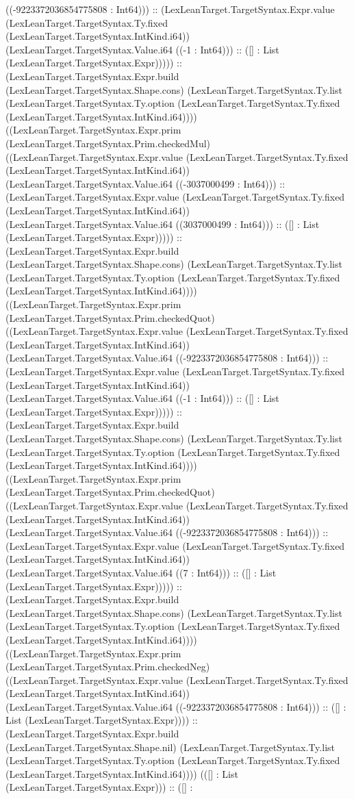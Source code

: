 \documentclass[11pt]{article}
\begin{document}
((-9223372036854775808 : Int64))) :: (LexLeanTarget.TargetSyntax.Expr.value (LexLeanTarget.TargetSyntax.Ty.fixed (LexLeanTarget.TargetSyntax.IntKind.i64)) (LexLeanTarget.TargetSyntax.Value.i64 ((-1 : Int64))) :: ([] : List (LexLeanTarget.TargetSyntax.Expr))))) :: (LexLeanTarget.TargetSyntax.Expr.build (LexLeanTarget.TargetSyntax.Shape.cons) (LexLeanTarget.TargetSyntax.Ty.list (LexLeanTarget.TargetSyntax.Ty.option (LexLeanTarget.TargetSyntax.Ty.fixed (LexLeanTarget.TargetSyntax.IntKind.i64)))) ((LexLeanTarget.TargetSyntax.Expr.prim (LexLeanTarget.TargetSyntax.Prim.checkedMul) ((LexLeanTarget.TargetSyntax.Expr.value (LexLeanTarget.TargetSyntax.Ty.fixed (LexLeanTarget.TargetSyntax.IntKind.i64)) (LexLeanTarget.TargetSyntax.Value.i64 ((-3037000499 : Int64))) :: (LexLeanTarget.TargetSyntax.Expr.value (LexLeanTarget.TargetSyntax.Ty.fixed (LexLeanTarget.TargetSyntax.IntKind.i64)) (LexLeanTarget.TargetSyntax.Value.i64 ((3037000499 : Int64))) :: ([] : List (LexLeanTarget.TargetSyntax.Expr))))) :: (LexLeanTarget.TargetSyntax.Expr.build (LexLeanTarget.TargetSyntax.Shape.cons) (LexLeanTarget.TargetSyntax.Ty.list (LexLeanTarget.TargetSyntax.Ty.option (LexLeanTarget.TargetSyntax.Ty.fixed (LexLeanTarget.TargetSyntax.IntKind.i64)))) ((LexLeanTarget.TargetSyntax.Expr.prim (LexLeanTarget.TargetSyntax.Prim.checkedQuot) ((LexLeanTarget.TargetSyntax.Expr.value (LexLeanTarget.TargetSyntax.Ty.fixed (LexLeanTarget.TargetSyntax.IntKind.i64)) (LexLeanTarget.TargetSyntax.Value.i64 ((-9223372036854775808 : Int64))) :: (LexLeanTarget.TargetSyntax.Expr.value (LexLeanTarget.TargetSyntax.Ty.fixed (LexLeanTarget.TargetSyntax.IntKind.i64)) (LexLeanTarget.TargetSyntax.Value.i64 ((-1 : Int64))) :: ([] : List (LexLeanTarget.TargetSyntax.Expr))))) :: (LexLeanTarget.TargetSyntax.Expr.build (LexLeanTarget.TargetSyntax.Shape.cons) (LexLeanTarget.TargetSyntax.Ty.list (LexLeanTarget.TargetSyntax.Ty.option (LexLeanTarget.TargetSyntax.Ty.fixed (LexLeanTarget.TargetSyntax.IntKind.i64)))) ((LexLeanTarget.TargetSyntax.Expr.prim (LexLeanTarget.TargetSyntax.Prim.checkedQuot) ((LexLeanTarget.TargetSyntax.Expr.value (LexLeanTarget.TargetSyntax.Ty.fixed (LexLeanTarget.TargetSyntax.IntKind.i64)) (LexLeanTarget.TargetSyntax.Value.i64 ((-9223372036854775808 : Int64))) :: (LexLeanTarget.TargetSyntax.Expr.value (LexLeanTarget.TargetSyntax.Ty.fixed (LexLeanTarget.TargetSyntax.IntKind.i64)) (LexLeanTarget.TargetSyntax.Value.i64 ((7 : Int64))) :: ([] : List (LexLeanTarget.TargetSyntax.Expr))))) :: (LexLeanTarget.TargetSyntax.Expr.build (LexLeanTarget.TargetSyntax.Shape.cons) (LexLeanTarget.TargetSyntax.Ty.list (LexLeanTarget.TargetSyntax.Ty.option (LexLeanTarget.TargetSyntax.Ty.fixed (LexLeanTarget.TargetSyntax.IntKind.i64)))) ((LexLeanTarget.TargetSyntax.Expr.prim (LexLeanTarget.TargetSyntax.Prim.checkedNeg) ((LexLeanTarget.TargetSyntax.Expr.value (LexLeanTarget.TargetSyntax.Ty.fixed (LexLeanTarget.TargetSyntax.IntKind.i64)) (LexLeanTarget.TargetSyntax.Value.i64 ((-9223372036854775808 : Int64))) :: ([] : List (LexLeanTarget.TargetSyntax.Expr)))) :: (LexLeanTarget.TargetSyntax.Expr.build (LexLeanTarget.TargetSyntax.Shape.nil) (LexLeanTarget.TargetSyntax.Ty.list (LexLeanTarget.TargetSyntax.Ty.option (LexLeanTarget.TargetSyntax.Ty.fixed (LexLeanTarget.TargetSyntax.IntKind.i64)))) (([] : List (LexLeanTarget.TargetSyntax.Expr))) :: ([] : 
\end{document}
